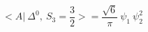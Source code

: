 \begin{equation}
<A|~\Delta^{0},~ S_3=\frac{3}{2} >= \frac{\sqrt{6}}{\pi} ~\psi_1~\psi_2^2
\end{equation}

